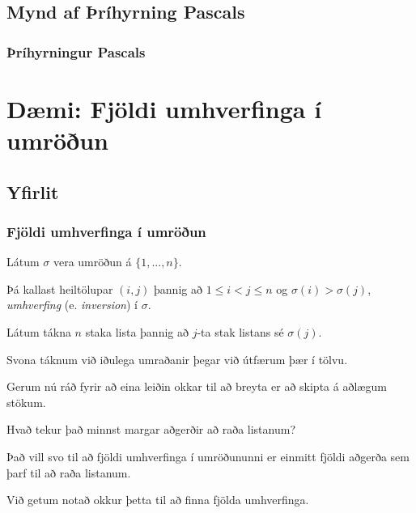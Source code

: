 \subsection{Mynd af Þríhyrning Pascals}
{
    \frametitle{Þríhyrningur Pascals}
    \pascal
}

\section{Dæmi: Fjöldi umhverfinga í umröðun}
\subsection{Yfirlit}
{
    \frametitle{Fjöldi umhverfinga í umröðun}
    {
        \item<1-> Látum $\sigma$ vera umröðun á $\{1, ..., n\}$.
        \item<2-> Þá kallast heiltölupar $(i, j)$ þannig að $1 \leq i < j \leq n$ og $\sigma(i) > \sigma(j)$,
            \emph{umhverfing} (e. \emph{inversion}) í $\sigma$.
        \item<3-> Látum  tákna $n$ staka lista þannig að $j$-ta stak listans sé $\sigma(j)$.
        \item<4-> Svona táknum við iðulega umraðanir þegar við útfærum þær í tölvu.
        \item<5-> Gerum nú ráð fyrir að eina leiðin okkar til að breyta  er að skipta á aðlægum stökum.
        \item<6-> Hvað tekur það minnst margar aðgerðir að raða listanum?
        \item<7-> Það vill svo til að fjöldi umhverfinga í umröðununni er einmitt fjöldi aðgerða sem þarf til að raða listanum.
        \item<8-> Við getum notað okkur þetta til að finna fjölda umhverfinga.
    }
}

